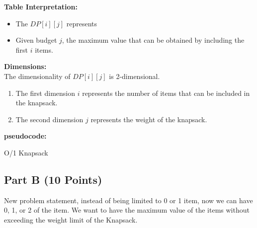 \documentclass{article}[12pt]
\begin{document}
\noindent\textbf{Table Interpretation:} \\
\begin{itemize}
  \item The $DP[i][j]$ represents 
  \item Given budget $j$, the maximum value that can be obtained by including the first $i$ items.
\end{itemize}
\noindent\textbf{Dimensions:} \\
The dimensionality of $DP[i][j]$ is 2-dimensional.
\begin{enumerate}
  \item The first dimension $i$ represents the number of items that can be included in the knapsack.
  \item The second dimension $j$ represents the weight of the knapsack.
\end{enumerate}

\pagebreak
\noindent\textbf{pseudocode:} \\

\begin{algorithm}[H]
 \caption{O/1 Knapsack}

\end{algorithm}

\newpage
\subsection{Part B (10 Points)}
New problem statement, instead of being limited to 0 or 1 item, now we can have 0, 1, or 2 of the item.
We want to have the maximum value of the items without exceeding the weight limit of the Knapsack.\\
\end{document}
